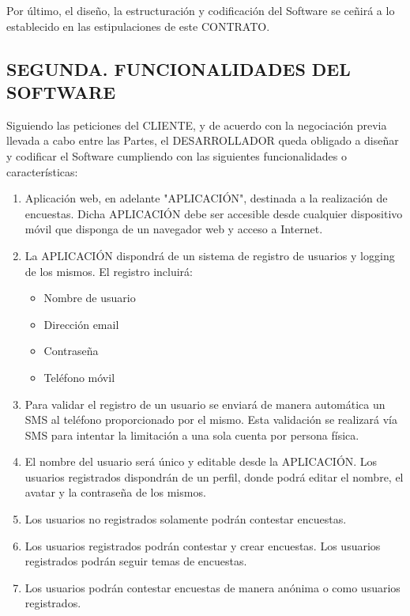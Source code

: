 \documentclass[a4paper,11pt]{report}
\begin{document}
	Por último, el diseño, la estructuración y codificación del Software se
	ceñirá a lo establecido en las estipulaciones de este CONTRATO.

	\subsection*{SEGUNDA. FUNCIONALIDADES DEL SOFTWARE}

	Siguiendo las peticiones del CLIENTE, y de acuerdo con la negociación
	previa llevada a cabo entre las Partes, el DESARROLLADOR queda obligado
	a diseñar y codificar el Software cumpliendo con las siguientes
	funcionalidades o características:
	\begin{enumerate}
		\item Aplicación web, en adelante "{APLICACIÓN}", destinada a la realización
		de encuestas. Dicha APLICACIÓN debe ser accesible desde cualquier
		dispositivo móvil que disponga de un navegador web y acceso a Internet.
		\item La APLICACIÓN dispondrá de un sistema de registro de usuarios y logging
		de los mismos. El registro incluirá:
			\begin{itemize}
				\item Nombre de usuario
				\item Dirección email
				\item Contraseña
				\item Teléfono móvil
			\end{itemize}
		\item Para validar el registro de un usuario se enviará de manera automática
		un SMS al teléfono proporcionado por el mismo. Esta validación se
		realizará vía SMS para intentar la limitación a una sola cuenta
		por persona física.

		\item El nombre del usuario será único y editable desde la APLICACIÓN.
		Los usuarios registrados dispondrán de un perfil, donde podrá editar el
		nombre, el avatar y la contraseña de los mismos.

		\item Los usuarios no registrados solamente podrán contestar encuestas.

		\item Los usuarios registrados podrán contestar y crear encuestas. Los
		usuarios registrados podrán seguir temas de encuestas.

		\item Los usuarios podrán contestar encuestas de manera anónima o
		como usuarios registrados.


\end{enumerate}
\end{document}
